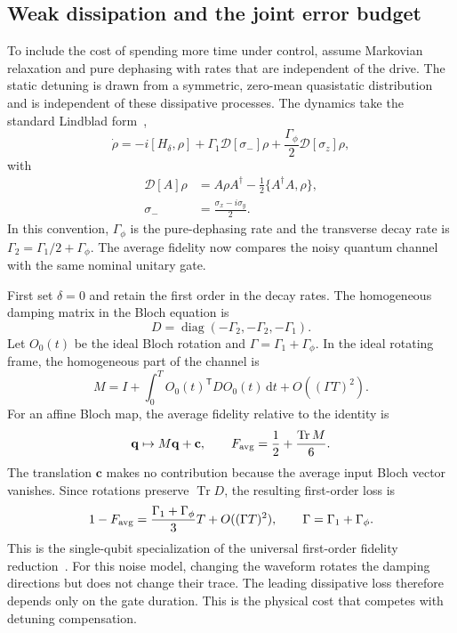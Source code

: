 \documentclass[12pt]{iopjournal}
\newcommand{\dd}{\mathrm{d}}
\begin{document}
\FloatBarrier
\subsection{Weak dissipation and the joint error budget}

To include the cost of spending more time under control, assume
Markovian relaxation and pure dephasing with rates that are
independent of the drive. The static detuning is drawn from a
symmetric, zero-mean quasistatic distribution and is independent of
these dissipative processes. The dynamics take the standard Lindblad
form~\cite{gorini1976,lindblad1976},
\begin{equation}
 \dot\rho=-i[H_\delta,\rho]
 +\Gamma_1\mathcal D[\sigma_-]\rho
 +\frac{\Gamma_\phi}{2}\mathcal D[\sigma_z]\rho,
 \label{eq:lindblad}
\end{equation}
with
\begin{equation*}
 \begin{aligned}
 \mathcal D[A]\rho
   &=A\rho A^\dagger-\frac12\{A^\dagger A,\rho\},\\
 \sigma_-&=\frac{\sigma_x-i\sigma_y}{2}.
 \end{aligned}
\end{equation*}
In this convention, $\Gamma_\phi$ is the pure-dephasing rate and the
transverse decay rate is $\Gamma_2=\Gamma_1/2+\Gamma_\phi$. The
average fidelity now compares the noisy quantum channel with the
same nominal unitary gate.

First set $\delta=0$ and retain the first order in the decay rates.
The homogeneous damping matrix in the Bloch equation is
\begin{equation*}
 D=\operatorname{diag}(-\Gamma_2,-\Gamma_2,-\Gamma_1).
\end{equation*}
Let $O_0(t)$ be the ideal Bloch rotation and
$\Gamma=\Gamma_1+\Gamma_\phi$. In the ideal rotating frame, the
homogeneous part of the channel is
\begin{equation*}
 M=I+\int_0^T O_0(t)^{\mathsf T}D O_0(t)\,\dd t
       +O((\Gamma T)^2).
\end{equation*}
For an affine Bloch map, the average fidelity relative to the identity
is~\cite{bowdrey2002,nielsen2002}
\begin{equation*}
 \mathbf q\mapsto M\mathbf q+\mathbf c,
 \qquad F_{\rm avg}=\frac12+\frac{\operatorname{Tr}M}{6}.
\end{equation*}
The translation $\mathbf c$ makes no contribution because the
average input Bloch vector vanishes. Since rotations preserve
$\operatorname{Tr}D$, the resulting first-order loss is
\begin{equation}
 1-F_{\rm avg}
 =\frac{\Gamma_1+\Gamma_\phi}{3}T+O((\Gamma T)^2),
 \qquad\Gamma=\Gamma_1+\Gamma_\phi.
 \label{eq:weak-dissipation}
\end{equation}
This is the single-qubit specialization of the universal first-order
fidelity reduction~\cite{abad2022}.
For this noise model, changing the waveform rotates the damping
directions but does not change their trace. The leading dissipative
loss therefore depends only on the gate duration. This is the
physical cost that competes with detuning compensation.
\end{document}
